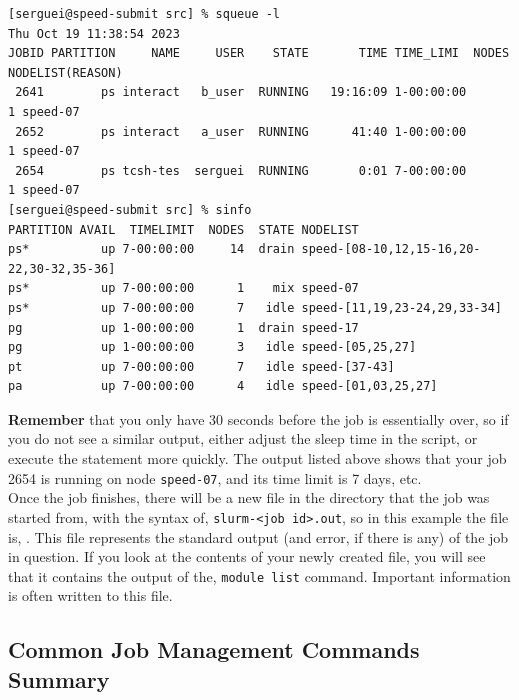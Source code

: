 \small
\begin{verbatim}
[serguei@speed-submit src] % squeue -l
Thu Oct 19 11:38:54 2023
JOBID PARTITION     NAME     USER    STATE       TIME TIME_LIMI  NODES NODELIST(REASON)
 2641        ps interact   b_user  RUNNING   19:16:09 1-00:00:00      1 speed-07
 2652        ps interact   a_user  RUNNING      41:40 1-00:00:00      1 speed-07
 2654        ps tcsh-tes  serguei  RUNNING       0:01 7-00:00:00      1 speed-07
[serguei@speed-submit src] % sinfo
PARTITION AVAIL  TIMELIMIT  NODES  STATE NODELIST
ps*          up 7-00:00:00     14  drain speed-[08-10,12,15-16,20-22,30-32,35-36]
ps*          up 7-00:00:00      1    mix speed-07
ps*          up 7-00:00:00      7   idle speed-[11,19,23-24,29,33-34]
pg           up 1-00:00:00      1  drain speed-17
pg           up 1-00:00:00      3   idle speed-[05,25,27]
pt           up 7-00:00:00      7   idle speed-[37-43]
pa           up 7-00:00:00      4   idle speed-[01,03,25,27]
\end{verbatim}
\normalsize

\noindent
\textbf{Remember} that you only have 30 seconds before the job is essentially over, so 
if you do not see a similar output, either adjust the sleep time in the 
script, or execute the  statement more quickly. The  
output listed above shows that your job 2654 is running on node \texttt{speed-07}, 
and its time limit is 7 days, etc.\\

Once the job finishes, there will be a new file in the directory that the job 
was started from, with the syntax of, \texttt{slurm-<job id>.out}, so 
in this example the file is, . This file represents the 
standard output (and error, if there is any) of the job in question. If you 
look at the contents of your newly created file, you will see that it 
contains the output of the, \texttt{module list} command. 
Important information is often written to this file.
%

\subsection{Common Job Management Commands Summary}
\label{sect:job-management-commands}

